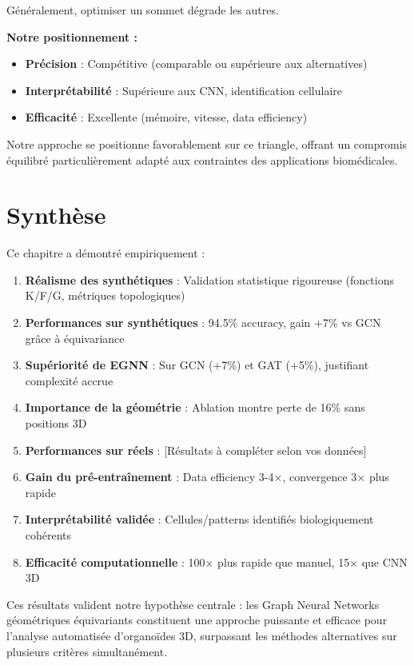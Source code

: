 Généralement, optimiser un sommet dégrade les autres.

\textbf{Notre positionnement :}
\begin{itemize}
    \item \textbf{Précision} : Compétitive (comparable ou supérieure aux alternatives)
    \item \textbf{Interprétabilité} : Supérieure aux CNN, identification cellulaire
    \item \textbf{Efficacité} : Excellente (mémoire, vitesse, data efficiency)
\end{itemize}

Notre approche se positionne favorablement sur ce triangle, offrant un compromis équilibré particulièrement adapté aux contraintes des applications biomédicales.

\section{Synthèse}

Ce chapitre a démontré empiriquement :

\begin{enumerate}
    \item \textbf{Réalisme des synthétiques} : Validation statistique rigoureuse (fonctions K/F/G, métriques topologiques)
    
    \item \textbf{Performances sur synthétiques} : 94.5\% accuracy, gain +7\% vs GCN grâce à équivariance
    
    \item \textbf{Supériorité de EGNN} : Sur GCN (+7\%) et GAT (+5\%), justifiant complexité accrue
    
    \item \textbf{Importance de la géométrie} : Ablation montre perte de 16\% sans positions 3D
    
    \item \textbf{Performances sur réels} : [Résultats à compléter selon vos données]
    
    \item \textbf{Gain du pré-entraînement} : Data efficiency 3-4×, convergence 3× plus rapide
    
    \item \textbf{Interprétabilité validée} : Cellules/patterns identifiés biologiquement cohérents
    
    \item \textbf{Efficacité computationnelle} : 100× plus rapide que manuel, 15× que CNN 3D
\end{enumerate}

Ces résultats valident notre hypothèse centrale : les Graph Neural Networks géométriques équivariants constituent une approche puissante et efficace pour l'analyse automatisée d'organoïdes 3D, surpassant les méthodes alternatives sur plusieurs critères simultanément.
